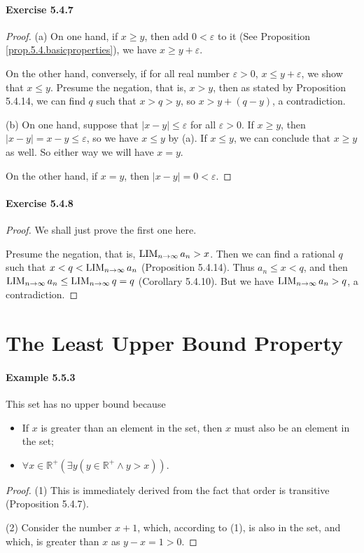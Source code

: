 \paragraph{Exercise 5.4.7} \label{exercise5.4.7}
\begin{proof}
(a)
On one hand, if $x\geq y$, then add $0<\varepsilon$ to it (See Proposition \ref{prop.5.4.basicproperties}), we have 
$x \geq y+\varepsilon$.

On the other hand, conversely, if for all real number $\varepsilon>0$, $x \leq y+\varepsilon$, we show that $x\leq y$. 
Presume the negation, that is, $x>y$, then as stated by Proposition 5.4.14, we can find $q$ such that $x>q>y$, so 
$x>y+(q-y)$, a contradiction.

(b)
On one hand, suppose that $|x-y|\leq \varepsilon$ for all $\varepsilon>0$. If $x\geq y$, then 
$|x-y|=x-y \leq \varepsilon$, so we have $x\leq y$ by (a). If $x\leq y$, we can conclude that $x\geq y$ as well. So 
either way we will have $x=y$.

On the other hand, if $x=y$, then $|x-y|=0<\varepsilon$.
\end{proof}

\paragraph{Exercise 5.4.8} \label{exercise5.4.8}
\begin{proof}
We shall just prove the first one here.

Presume the negation, that is, $\operatorname*{LIM}_{n \to \infty}{a_n}>x$. Then we can find a rational $q$ such that $x<q<\operatorname*{LIM}_{n \to \infty}{a_n}$
(Proposition 5.4.14). Thus
$a_n\leq x<q$,
and then $\operatorname*{LIM}_{n \to \infty}{a_n}\leq\operatorname*{LIM}_{n \to \infty}{q}=q$ (Corollary 5.4.10). But we have $\operatorname*{LIM}_{n \to \infty}{a_n}>q$, a contradiction.
\end{proof}

\section{The Least Upper Bound Property}

\paragraph{Example 5.5.3}
This set has no upper bound because
\begin{itemize}
\item If $x$ is greater than an element in the set, then $x$ must also be an element in the set;
\item $\forall x \in \mathbb{R}^+(\exists y(y \in \mathbb{R}^+ \wedge y>x))$.
\end{itemize}
\begin{proof}
(1)
This is immediately derived from the fact that order is transitive (Proposition 5.4.7).

(2)
Consider the number $x+1$, which, according to (1), is also in the set, and which, is greater than $x$ as $y-x = 1>0$.
\end{proof}

